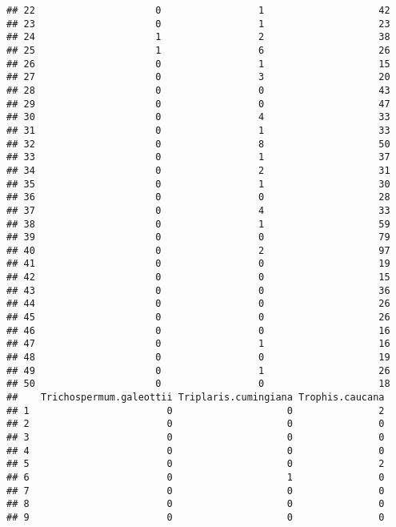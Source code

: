 \documentclass[
]{article}
\begin{document}
\begin{verbatim}
## 22                     0                 1                    42
## 23                     0                 1                    23
## 24                     1                 2                    38
## 25                     1                 6                    26
## 26                     0                 1                    15
## 27                     0                 3                    20
## 28                     0                 0                    43
## 29                     0                 0                    47
## 30                     0                 4                    33
## 31                     0                 1                    33
## 32                     0                 8                    50
## 33                     0                 1                    37
## 34                     0                 2                    31
## 35                     0                 1                    30
## 36                     0                 0                    28
## 37                     0                 4                    33
## 38                     0                 1                    59
## 39                     0                 0                    79
## 40                     0                 2                    97
## 41                     0                 0                    19
## 42                     0                 0                    15
## 43                     0                 0                    36
## 44                     0                 0                    26
## 45                     0                 0                    26
## 46                     0                 0                    16
## 47                     0                 1                    16
## 48                     0                 0                    19
## 49                     0                 1                    26
## 50                     0                 0                    18
##    Trichospermum.galeottii Triplaris.cumingiana Trophis.caucana
## 1                        0                    0               2
## 2                        0                    0               0
## 3                        0                    0               0
## 4                        0                    0               0
## 5                        0                    0               2
## 6                        0                    1               0
## 7                        0                    0               0
## 8                        0                    0               0
## 9                        0                    0               0

\end{verbatim}
\end{document}
